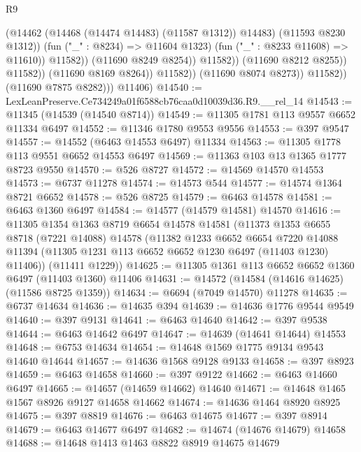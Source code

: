 \begin{lexlean}{R9}
\begin{coremodule}
                                          (@14462 (@14468 (@14474 @14483) (@11587 @1312)) @14483)
                                          (@11593 @8230 @1312))
                                        (fun ("_" : @8234) => @11604 @1323)
                                        (fun ("_" : @8233 @11608) => @11610))
                                      @11582))
                                  (@11690 @8249 @8254))
                                @11582))
                            (@11690 @8212 @8255))
                          @11582))
                      (@11690 @8169 @8264))
                    @11582))
                (@11690 @8074 @8273))
              @11582))
          (@11690 @7875 @8282)))
      @11406)
@14540 := LexLeanPreserve.Ce734249a01f6588cb76caa0d10039d36.R9.__rel_14
@14543 := @11345 (@14539 (@14540 @8714))
@14549 := @11305 @1781 @113 @9557 @6652 @11334 @6497
@14552 := @11346 @1780 @9553 @9556
@14553 := @397 @9547
@14557 := @14552 (@6463 @14553 @6497) @11334
@14563 := @11305 @1778 @113 @9551 @6652 @14553 @6497
@14569 := @11363 @103 @13 @1365 @1777 @8723 @9550
@14570 := @526 @8727
@14572 := @14569 @14570 @14553
@14573 := @6737 @11278
@14574 := @14573 @544
@14577 := @14574 @1364 @8721 @6652
@14578 := @526 @8725
@14579 := @6463 @14578
@14581 := @6463 @1360 @6497
@14584 := @14577 (@14579 @14581) @14570
@14616 := @11305
    @1354
    @1363
    @8719
    @6654
    @14578
    @14581
    (@11373
      @1353
      @6655
      @8718
      (@7221 @14088)
      @14578
      (@11382
        @1233
        @6652
        @6654
        @7220
        @14088
        @11394
        (@11305 @1231 @113 @6652 @6652 @1230 @6497 (@11403 @1230) @11406))
      (@11411 @1229))
@14625 := @11305 @1361 @113 @6652 @6652 @1360 @6497 (@11403 @1360) @11406
@14631 := @14572 (@14584 (@14616 @14625) (@11586 @8725 @1359))
@14634 := @6694 (@7049 @14570) @11278
@14635 := @6737 @14634
@14636 := @14635 @394
@14639 := @14636 @1776 @9544 @9549
@14640 := @397 @9131
@14641 := @6463 @14640
@14642 := @397 @9538
@14644 := @6463 @14642 @6497
@14647 := @14639 (@14641 @14644) @14553
@14648 := @6753 @14634
@14654 := @14648 @1569 @1775 @9134 @9543 @14640 @14644
@14657 := @14636 @1568 @9128 @9133
@14658 := @397 @8923
@14659 := @6463 @14658
@14660 := @397 @9122
@14662 := @6463 @14660 @6497
@14665 := @14657 (@14659 @14662) @14640
@14671 := @14648 @1465 @1567 @8926 @9127 @14658 @14662
@14674 := @14636 @1464 @8920 @8925
@14675 := @397 @8819
@14676 := @6463 @14675
@14677 := @397 @8914
@14679 := @6463 @14677 @6497
@14682 := @14674 (@14676 @14679) @14658
@14688 := @14648 @1413 @1463 @8822 @8919 @14675 @14679

\end{coremodule}
\end{lexlean}
